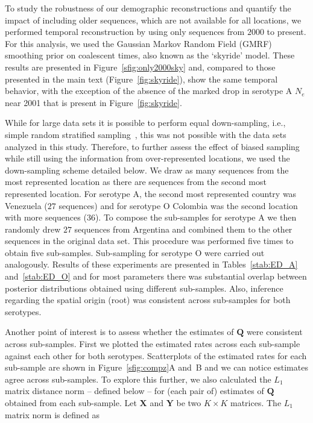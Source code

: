 \documentclass[a4paper,10pt]{article}
\begin{document}
To study the robustness of our demographic reconstructions and quantify the impact of including older sequences, which are not available for all locations, we performed temporal reconstruction by using only sequences from $2000$ to present.
For this analysis, we used the Gaussian Markov Random Field (GMRF) smoothing prior \cite{M-skyride} on coalescent times, also known as the `skyride' model.
These results are presented in Figure~\ref{sfig:only2000sky} and, compared to those presented in the main text (Figure~\ref{fig:skyride}), show the same temporal behavior, with the exception of the absence of the marked drop in serotype A $N_e$ near 2001 that is present in Figure~\ref{fig:skyride}.

While for large data sets it is possible to perform equal down-sampling, i.e., simple random stratified sampling~\cite{M-fluPNAS}, this was not possible  with the data sets analyzed in this study.
Therefore, to further assess the effect of biased sampling while still using the information from over-represented locations, we used the down-sampling scheme detailed below.
We draw as many sequences from the most represented location as there are sequences from the second most represented location.
For serotype A, the second most represented country was Venezuela ($27$ sequences) and for serotype O Colombia was the second location with more sequences ($36$).
To compose the sub-samples for serotype A we then randomly drew $27$ sequences from Argentina and combined them to the other sequences in the original data set.
This procedure was performed five times to obtain five sub-samples.
Sub-sampling for serotype O were carried out analogously.
Results of these experiments are presented in Tables~\ref{stab:ED_A} and~\ref{stab:ED_O} and for most parameters there was substantial overlap between posterior distributions obtained using different sub-samples.
Also, inference regarding the spatial origin (root) was consistent across sub-samples for both serotypes.

Another point of interest is to assess whether the estimates of $\mathbf{Q}$ were consistent across sub-samples.
First we plotted the estimated rates across each sub-sample against each other for both serotypes.
Scatterplots of the estimated rates for each sub-sample are shown in Figure~\ref{sfig:compz}A and~B and we can notice estimates agree across sub-samples.
To explore this further, we also calculated the $L_1$ matrix distance norm -- defined below -- for (each pair of) estimates of $\mathbf{Q}$ obtained from each sub-sample.
Let $\mathbf{X}$ and $\mathbf{Y}$ be two $K \times K$ matrices.
The $L_1$ matrix norm is defined as
\end{document}
